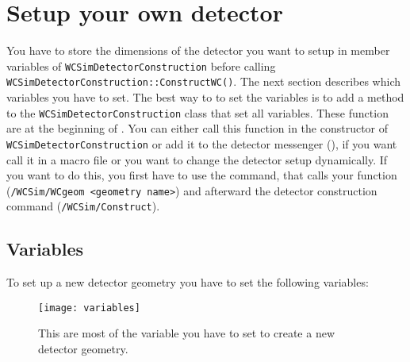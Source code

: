 
\section{Setup your own detector}

You have to store the dimensions of the detector you want to setup in member variables of  \texttt{WCSimDetectorConstruction} before calling  \texttt{WCSimDetectorConstruction::ConstructWC()}. The next section describes which variables you have to set. The best way to to set the variables is to add a method to the \texttt{WCSimDetectorConstruction} class that set all variables. These function are at the beginning of .
You can either call this function in the constructor of \texttt{WCSimDetectorConstruction} or add it to the detector messenger (), if you want call it in a macro file or you want to change the detector setup dynamically. If you want to do this, you first have to use the command, that calls your function (\texttt{/WCSim/WCgeom <geometry name>}) and afterward the detector construction command (\texttt{/WCSim/Construct}).

\subsection{Variables}
To set up a new detector geometry you have to set the following variables:

\begin{figure}
  \begin{center}
\texttt{[image: variables]}
  \end{center}
\caption{This are most of the variable you have to set to create a new detector geometry.}
\end{figure}



